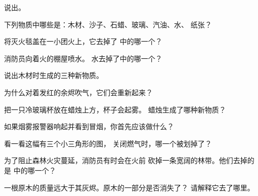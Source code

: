\begin{exercise}[$\star$]\label{exo:g4:what-a-fire-needs:1}
说出。
\end{exercise}

\begin{exercise}[$\star$]\label{exo:g4:what-a-fire-needs:2}
下列物质中哪些是：木材、沙子、石蜡、玻璃、汽油、水、
纸张？
\end{exercise}

\begin{exercise}[$\star$]\label{exo:g4:what-a-fire-needs:3}
将灭火毯盖在一小团火上，它去掉了
中的哪一个？
\end{exercise}

\begin{exercise}[$\star$]\label{exo:g4:what-a-fire-needs:4}
消防员向着火的棚屋喷水。
水去掉了中的哪一个？
\end{exercise}

\begin{exercise}[$\star$]\label{exo:g4:what-a-fire-needs:5}
说出木材时生成的三种新物质。
\end{exercise}

\begin{exercise}[$\star$]\label{exo:g4:what-a-fire-needs:6}
为什么对着发红的余烬吹气，它们会重新起来？
\end{exercise}

\begin{exercise}[$\star$]\label{exo:g4:what-a-fire-needs:7}
把一只冷玻璃杯放在蜡烛上方，杯子会起雾。
蜡烛生成了哪种新物质？
\end{exercise}

\begin{exercise}[$\star$]\label{exo:g4:what-a-fire-needs:8}
如果烟雾报警器响起并看到冒烟，你首先应该做什么？
\end{exercise}

\begin{exercise}[$\star$]\label{exo:g4:what-a-fire-needs:9}
看一看这幅有三个小三角形的图，
关闭燃气时，哪一个被划掉了？
\end{exercise}

\begin{exercise}[$\star\star$]\label{exo:g4:what-a-fire-needs:10}
为了阻止森林火灾蔓延，消防员有时会在火前
砍掉一条宽阔的林带。他们去掉的是
中的哪一个？
\end{exercise}

\begin{exercise}[$\star\star$]\label{exo:g4:what-a-fire-needs:11}
一根原木的质量远大于其灰烬。原木的一部分是否消失了？
请解释它去了哪里。
\end{exercise}
